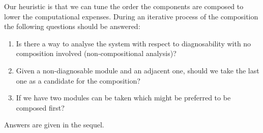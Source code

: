 \documentclass[a4paper, 10pt, conference]{ieeeconf} \IEEEoverridecommandlockouts
\begin{document}
Our heuristic is
that we can tune the order the components are composed to lower the
computational expenses. During an iterative process of the composition the
following questions should be answered:
\begin{enumerate}
  \item Is there a way to analyse the system with respect to diagnosability with
  no composition involved (non-compositional analysis)?
  \item Given a non-diagnosable module and an adjacent one, should we take
  the last one as a candidate for the composition?
  \item If we have two modules can be taken which might be preferred to be
  composed first?
\end{enumerate}

Answers are given in the sequel.

% 
% 
% 
\end{document}
